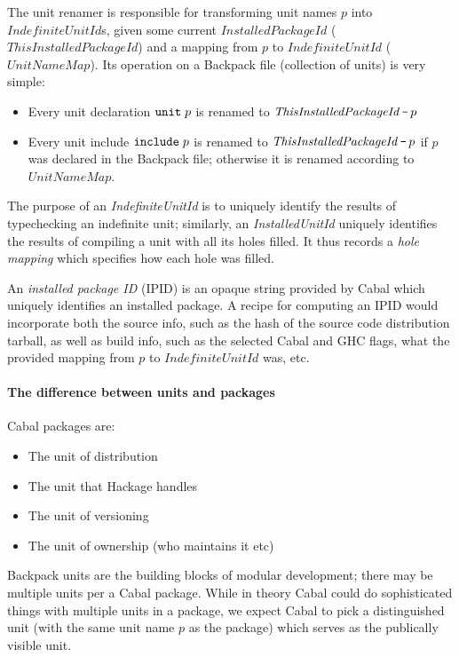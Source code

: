 \documentclass{article}
\newcommand{\I}[1]{\ensuremath{\mathit{#1}}}
\begin{document}
The unit renamer is responsible for transforming unit names $p$ into \I{IndefiniteUnitId}s, given some current \I{InstalledPackageId} (\I{ThisInstalledPackageId}) and a mapping from $p$ to
\I{IndefiniteUnitId} (\I{UnitNameMap}).  Its operation on a Backpack file (collection of units) is very simple:

\begin{itemize}
    \item Every unit declaration $\verb|unit|\; p$ is renamed to $\I{ThisInstalledPackageId}\, \verb|-|\, p$
    \item Every unit include $\verb|include|\; p$ is renamed to $\I{ThisInstalledPackageId}\, \verb|-|\, p$ if $p$ was declared in the Backpack file; otherwise it is renamed according to \I{UnitNameMap}.
\end{itemize}
%
The purpose of an \emph{IndefiniteUnitId} is to uniquely identify the results of typechecking
an indefinite unit; similarly, an \emph{InstalledUnitId} uniquely identifies
the results of compiling a unit with all its holes
filled.  It thus records a \emph{hole mapping} which specifies how each
hole was filled.

An \emph{installed package ID} (IPID) is an opaque string provided by
Cabal which uniquely identifies an installed package.  A recipe for
computing an IPID would incorporate both the source info, such as the hash of the
source code distribution tarball, as well as build info, such
as the selected Cabal and GHC flags, what the provided mapping from
$p$ to $IndefiniteUnitId$ was, etc.

\paragraph{The difference between units and packages}
Cabal packages are:

\begin{itemize}
    \item The unit of distribution
    \item The unit that Hackage handles
    \item The unit of versioning
    \item The unit of ownership (who maintains it etc) 
\end{itemize}

Backpack units are the building blocks of modular development;
there may be multiple units per a Cabal package.  While in theory
Cabal could do sophisticated things with multiple units in a
package, we expect Cabal
to pick a distinguished unit (with the same unit name $p$ as
the package) which serves as the publically visible unit.
\end{document}
